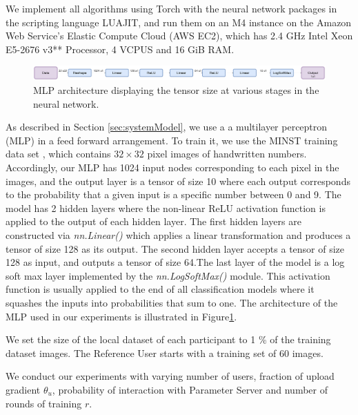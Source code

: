 \documentclass[conference]{IEEEtran}
\begin{document}
We implement all algorithms using Torch with the neural network packages in the scripting language LUAJIT, and run them on an M4
instance on the Amazon Web Service's Elastic Compute Cloud (AWS EC2), which has
2.4 GHz Intel Xeon E5-2676 v3** Processor, 4 VCPUS and 16	GiB RAM.

\begin{figure}[t]
\centering
\includegraphics[width = 2 \columnwidth, keepaspectratio]{MLPArchitecture}
\caption{MLP architecture displaying the tensor size at various stages in the neural network. }
\label{fig:MLPArch}
\end{figure}
As described in Section \ref{sec:systemModel}, we use a 
a multilayer perceptron (MLP) in a feed forward arrangement. To train it, we use the MINST training data set \cite{deng2012mnist}, which contains 
$32\times 32$ pixel images of handwritten numbers. Accordingly, our MLP has 1024 input nodes
corresponding to each pixel in the images, and the output layer is a tensor of size 10 where each output corresponds to the probability
that a given input is a specific number
between 0 and 9.  The model has 2 hidden layers where the non-linear ReLU activation function is applied to the
output of each hidden layer.  The first hidden layers are constructed via \textit{nn.Linear()} which applies a linear transformation
and produces a tensor of size 128 as its output. The second hidden layer accepts a tensor of size 128 as input, and outputs a tensor of
size 64.The last layer of the model is a log soft max layer implemented by the \textit{nn.LogSoftMax()} module.  This activation
function is usually applied to the end of all classification models where it squashes the inputs into probabilities that sum to one.
The architecture of the MLP used in our experiments is illustrated in Figure\ref{fig:MLPArch}.

We set the size of the local dataset of each participant to 1 \% of the training dataset images. 
The Reference User starts with a training set of 60 images.

We conduct our experiments with varying number of users, fraction of upload gradient $\theta_u$, probability of interaction with Parameter Server and number of rounds of training $r$.
\end{document}
